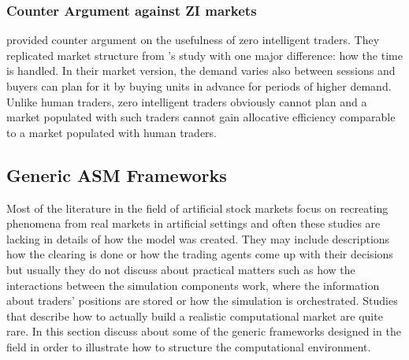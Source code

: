 \subsubsection{Counter Argument against ZI markets}
\citet{Mil08} provided counter argument on the usefulness of zero
intelligent traders. They replicated market structure from
\citeauthor{God93}'s study with one major difference: how the 
time is handled. In their market version, the demand varies
also between sessions and buyers can plan for it by buying units
in advance for periods of higher demand. Unlike human traders,
zero intelligent traders obviously cannot plan and a market
populated with such traders cannot gain allocative efficiency comparable
to a market populated with human traders. 


\subsection{Generic ASM Frameworks}

Most of the literature in the field of artificial stock markets 
focus on recreating phenomena from real markets in artificial settings
and often these studies are lacking in details of how the model was created.
They may include descriptions how the clearing is done or how the trading agents 
come up with their decisions but usually they do not discuss about practical matters 
such as how the interactions between the simulation components work, where the 
information about traders' positions are stored or how the simulation is orchestrated. 
Studies that describe how to actually build a realistic computational 
market are quite rare. In this section discuss about some of the generic
frameworks designed in the field in order to illustrate how to structure the computational
environment.


